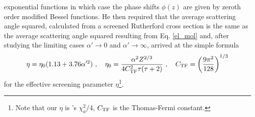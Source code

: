 exponential functions in which case the phase shifts $\phi(z)$ are
given by zeroth order modified Bessel functions. He then required
that the average scattering angle squared, calculated from a
screened Rutherford cross section is the same as the average
scattering angle squared resulting from Eq. \eqref{el_mol} and,
after studying the limiting cases $\alpha' \to 0$ and
$\alpha' \to \infty$, arrived at the simple formula
\begin{equation}
\label{eta_0}
\eta = \eta_0 (1.13 + 3.76 \alpha^{\prime 2} )~, \quad
\eta_0 = {\alpha^2 Z^{2/3} \over 4 C_{\rm TF}^2 \tau (\tau + 2)}~,
\quad C_{\rm TF} = \left( {9 \pi^2 \over 128} \right)^{1/3}
\end{equation}
for the effective screening parameter $\eta$\footnote{Note that our
$\eta$ is \Mol's $\chi_a^2/4$, $C_{\rm TF}$ is the Thomas-Fermi
constant.}.

